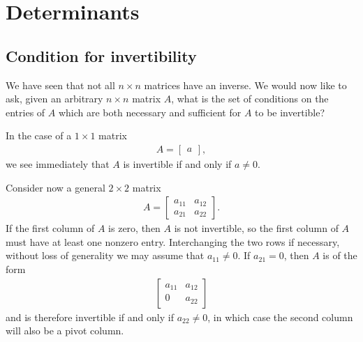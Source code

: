 \documentclass[12pt,letterpaper,reqno]{article}
\numberwithin{equation}{section}
\begin{document}
\section{Determinants}\label{sec:determinants}
\subsection{Condition for invertibility}
We have seen that not all $n \times n$ matrices have an inverse. We would now like to ask, given an arbitrary $n \times n$ matrix $A$, what is the set of conditions on the entries of $A$ which are both necessary and sufficient for $A$ to be invertible?

In the case of a $1 \times 1$ matrix
\begin{align*}
	A=\begin{bmatrix}
		a
	\end{bmatrix},
\end{align*}
we see immediately that $A$ is invertible if and only if $a \neq 0$.

Consider now a general $2 \times 2$ matrix
\begin{align*}
	A=\begin{bmatrix}
		a_{11} & a_{12} \\
		a_{21} & a_{22}
	\end{bmatrix}.
\end{align*}
If the first column of $A$ is zero, then $A$ is not invertible, so the first column of $A$ must have at least one nonzero entry. Interchanging the two rows if necessary, without loss of generality we may assume that $a_{11} \neq 0$. If $a_{21}=0$, then $A$ is of the form
\begin{align*}
	\begin{bmatrix}
		a_{11} & a_{12} \\
		0 & a_{22}
	\end{bmatrix}
\end{align*}
and is therefore invertible if and only if $a_{22} \neq 0$, in which case the second column will also be a pivot column.
\end{document}
